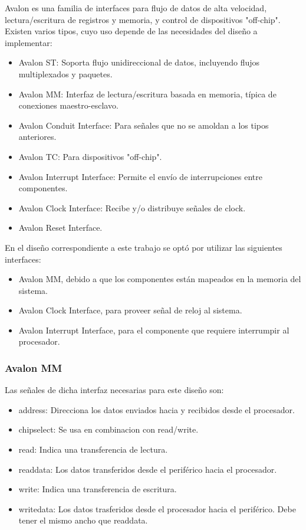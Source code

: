 Avalon es una familia de interfaces para flujo de datos de alta velocidad, lectura/escritura de registros y memoria, y control de dispositivos "off-chip". Existen varios tipos, cuyo uso depende de las necesidades del diseño a implementar:
\begin{itemize}
	\item Avalon ST: Soporta flujo unidireccional de datos, incluyendo flujos multiplexados y paquetes.
	\item Avalon MM: Interfaz de lectura/escritura basada en memoria, típica de conexiones maestro-esclavo.
	\item Avalon Conduit Interface: Para señales que no se amoldan a los tipos anteriores.
	\item Avalon TC: Para dispositivos "off-chip".
	\item Avalon Interrupt Interface: Permite el envío de interrupciones entre componentes.
	\item Avalon Clock Interface: Recibe y/o distribuye señales de clock.
	\item Avalon Reset Interface.
\end{itemize}

En el diseño correspondiente a este trabajo se optó por utilizar las siguientes interfaces:

\begin{itemize}
	\item Avalon MM, debido a que los componentes están mapeados en la memoria del sistema.
	\item Avalon Clock Interface, para proveer señal de reloj al sistema.
	\item Avalon Interrupt Interface, para el componente que requiere interrumpir al procesador.
\end{itemize}

\subsubsection{Avalon MM}
Las señales de dicha interfaz necesarias para este diseño son:

\begin{itemize}
	\item address: Direcciona los datos enviados hacia y recibidos desde el procesador.
	\item chipselect: Se usa en combinacion con read/write.
	\item read: Indica una transferencia de lectura.
	\item readdata: Los datos transferidos desde el periférico hacia el procesador.
	\item write: Indica una transferencia de escritura.
	\item writedata: Los datos trasferidos desde el procesador hacia el periférico. Debe tener el mismo ancho que readdata.

\end{itemize}

